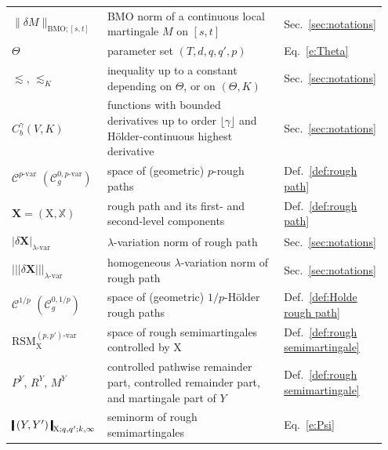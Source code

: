 \documentclass[11pt,reqno]{amsart}
\numberwithin{equation}{section}
\newcommand{\shortthickbar}{%
  \vcenter{\hbox{\rule{1.8pt}{2.2ex}}}%
}
\newcommand{\thicknm}[1]{%
  \mathopen{\shortthickbar}%
  \mkern4mu #1 \mkern4mu%
  \mathclose{\shortthickbar}%
}
\newcommand{\triplenorm}[1]{%
\left|\!\left|\!\left|#1\right|\!\right|\!\right|%
}
\begin{document}
\begin{longtable}{@{}p{0.24\linewidth} p{0.56\linewidth} p{0.15\linewidth}@{}}
$\|\delta M\|_{\mathrm{BMO};[s,t]}$ & BMO norm of a continuous local martingale $M$ on $[s,t]$ & Sec.~\ref{sec:notations} \\
$\Theta$ & parameter set $(T,d,q,q',p)$ & Eq.~\ref{e:Theta} \\
$\lesssim$, $\lesssim_K$ & inequality up to a constant depending on $\Theta$, or on $(\Theta,K)$ & Sec.~\ref{sec:notations} \\
$C_b^\gamma(V,K)$ & functions with bounded derivatives up to order $\lfloor\gamma\rfloor$ and H\"older-continuous highest derivative & Sec.~\ref{sec:notations} \\
$\mathscr C^{p\text{-}\mathrm{var}}$ $(\mathscr C^{0,p\text{-}\mathrm{var}}_g)$ & space of (geometric) $p$-rough paths & Def.~\ref{def:rough path} \\
$\mathbf X=(\mathrm X,\mathbb X)$ & rough path and its first- and second-level components & Def.~\ref{def:rough path} \\
$|\delta \mathbf X|_{\lambda\text{-}\mathrm{var}}$ & $\lambda$-variation norm of rough path & Sec.~\ref{sec:notations}\\
$\triplenorm{\delta \mathbf X}_{\lambda\text{-}\mathrm{var}}$ & homogeneous $\lambda$-variation norm of rough path & Sec.~\ref{sec:notations} \\
$\mathscr C^{1/p}$ $(\mathscr C^{0,1/p}_g)$ & space of (geometric) $1/p$-H\"older rough paths & Def.~\ref{def:Holde rough path} \\
$\mathrm{RSM}_{\mathrm X}^{(p,p')\text{-}\mathrm{var}}$ & space of rough semimartingales controlled by $\mathrm X$ & Def.~\ref{def:rough semimartingale} \\
$P^Y$, $R^Y$, $M^Y$ &  controlled pathwise remainder part, controlled remainder part, and martingale part of $Y$ & Def.~\ref{def:rough semimartingale} \\
$\thicknm{(Y,Y')}_{\mathrm X;q,q';k,\infty}$ &  seminorm of rough semimartingales  & Eq.~\ref{e:Psi} 
\end{longtable}




\end{document}
